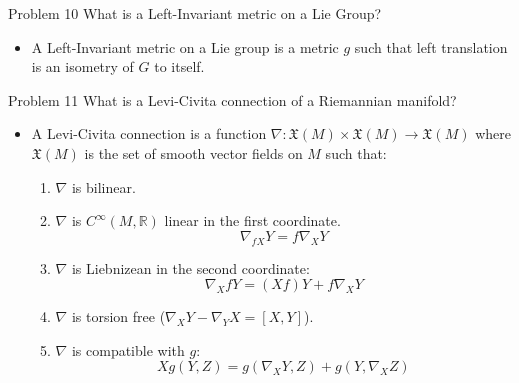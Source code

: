 \documentclass{beamer}
\begin{document}
    \begin{frame}{Problem 10}
        What is a Left-Invariant metric on a Lie Group?
        \begin{itemize}
            \item A Left-Invariant metric on a Lie group is a metric $g$ such
                that left translation is an isometry of $G$ to itself.
        \end{itemize}
    \end{frame}
    \begin{frame}{Problem 11}
        What is a Levi-Civita connection of a Riemannian manifold?
        \begin{itemize}
            \item A Levi-Civita connection is a function
                $\nabla:\mathfrak{X}(M)\times\mathfrak{X}(M)\rightarrow\mathfrak{X}(M)$
                where $\mathfrak{X}(M)$ is the set of smooth vector fields on $M$
                such that:
                \begin{enumerate}
                    \item $\nabla$ is bilinear.
                    \item $\nabla$ is $C^{\infty}(M,\mathbb{R})$ linear in the
                        first coordinate.
                        \begin{equation}
                            \nabla_{fX}Y=f\nabla_{X}Y
                        \end{equation}
                    \item $\nabla$ is Liebnizean in the second coordinate:
                        \begin{equation}
                            \nabla_{X}fY=(Xf)Y+f\nabla_{X}Y
                        \end{equation}
                    \item $\nabla$ is torsion free ($\nabla_{X}Y-\nabla_{Y}X=[X,Y]$).
                    \item $\nabla$ is compatible with $g$:
                        \begin{equation}
                            Xg(Y,Z)=g(\nabla_{X}Y,Z)+g(Y,\nabla_{X}Z)
                        \end{equation}
                \end{enumerate}
        \end{itemize}
    \end{frame}
\end{document}
